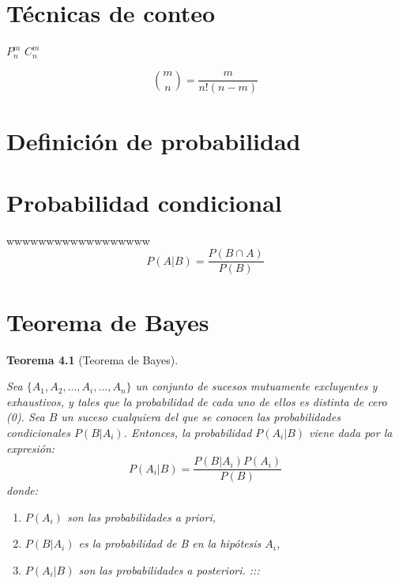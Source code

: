 \documentclass[
  11pt,
]{krantz}
\providecommand{\tightlist}{%
  \setlength{\itemsep}{0pt}\setlength{\parskip}{0pt}}
\newtheorem{theorem}{Teorema}[chapter]
\theoremstyle{definition}
\theoremstyle{definition}
\theoremstyle{definition}
\theoremstyle{definition}
\theoremstyle{remark}
\begin{document}
\hypertarget{tuxe9cnicas-de-conteo}{%
\chapter{Técnicas de conteo}\label{tuxe9cnicas-de-conteo}}

\(P_n^m\) \(C_n^m\)

\[\binom{m}{n}=\frac{m}{n!(n-m)}\]

\hypertarget{definiciuxf3n-de-probabilidad}{%
\chapter{Definición de probabilidad}\label{definiciuxf3n-de-probabilidad}}

\hypertarget{probabilidad-condicional}{%
\chapter{Probabilidad condicional}\label{probabilidad-condicional}}

\leavevmode\hypertarget{wwwwwwww}{}%
wwwwwwwwwwwwwwwwww\[P(A|B)= \frac{P(B\cap A)}{P(B)}\]

\hypertarget{teorema-de-bayes}{%
\chapter{Teorema de Bayes}\label{teorema-de-bayes}}

\begin{theorem}[Teorema de Bayes]
\protect\hypertarget{thm:wwwwwwwwwwwwwwwwwwwwwwwwww}{}\label{thm:wwwwwwwwwwwwwwwwwwwwwwwwww}

Sea \(\{A_{1},A_{2},...,A_{i},...,A_{n}\}\) un conjunto de sucesos mutuamente excluyentes y exhaustivos, y tales que la probabilidad de cada uno de ellos es distinta de cero (0). Sea \(B\) un suceso cualquiera del que se conocen las probabilidades condicionales \(P(B|A_i )\). Entonces, la probabilidad \(P(A_i|B)\) viene dada por la expresión: \[P(A_i|B)=\frac{P(B|A_i)P(A_i)}{P(B)}\] donde:

\begin{enumerate}
\def\labelenumi{\arabic{enumi}.}
\tightlist
\item
  \(P(A_i)\) son las probabilidades a priori,
\item
  \(P(B|A_i)\) es la probabilidad de B en la hipótesis \(A_i\),
\item
  \(P(A_i|B)\) son las probabilidades a posteriori. :::
\end{enumerate}

\end{theorem}
\end{document}

